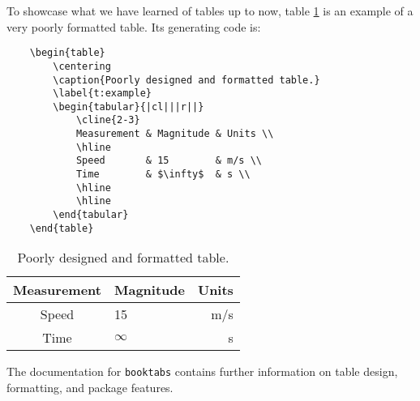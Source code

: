 To showcase what we have learned of tables up to now, table
\ref{t:example} is an example of a very poorly formatted table.  Its
generating code is:
\begin{verbatim}
	\begin{table}
	    \centering
	    \caption{Poorly designed and formatted table.}
	    \label{t:example}
	    \begin{tabular}{|cl|||r||}
	        \cline{2-3}
	        Measurement & Magnitude & Units \\
	        \hline
	        Speed		& 15		& m/s \\
	        Time		& $\infty$	& s \\
	        \hline
	        \hline
	    \end{tabular}
	\end{table}
\end{verbatim}
\begin{table}[!htbp]
    \centering
    \caption{Poorly designed and formatted table.}
    \label{t:example}
    \begin{tabular}{|cl|||r||}
        \cline{2-3}
        Measurement & Magnitude & Units \\
        \hline
        Speed		& 15		& m/s \\
        Time		& $\infty$	& s \\
        \hline
        \hline
    \end{tabular}
\end{table}

The documentation for \verb|booktabs| contains further information on
table design, formatting, and package features.
%
